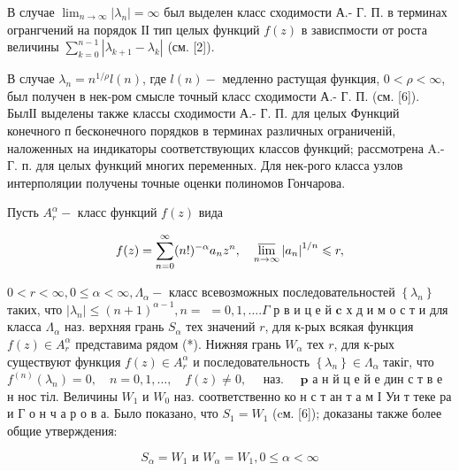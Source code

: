 \documentclass[10pt]{article}
\begin{document}
В случае $\lim _{n \rightarrow \infty}\left|\lambda_{n}\right|=\infty$ был выделен класс сходимости А.- Г. П. в терминах огрангчений на порядок ІІ тип целых функций $f(z)$ в зависпмости от роста величины $\sum_{k=0}^{n-1}\left|\lambda_{k+1}-\lambda_{k}\right|$ (см. [2]).



В случае $\lambda_{n}=n^{1 / \rho} l(n)$, где $l(n)-$ медленно растущая функция, $0<\rho<\infty$, был получен в нек-ром смысле точный класс сходимости А.- Г. П. (см. [6]). БылІІ выделены также классы сходимости А.- Г. П. для целых Функций конечного п бесконечного порядков в терминах различных ограниченій, наложенных на индикаторы соответствующих классов функций; рассмотрена A.- Г. п. для целых функций многих переменных. Для нек-рого класса узлов интерполяции получены точные оценки полиномов Гончарова.



Пусть $A_{r}^{\alpha}-$ класс функций $f(z)$ вида



\[

f(z)=\sum_{n=0}^{\infty}(n !)^{-\alpha} a_{n} z^{n}, \quad \varlimsup_{n \rightarrow \infty}\left|a_{n}\right|^{1 / n} \leqslant r,

\]



$0<r<\infty, 0 \leqslant \alpha<\infty, \Lambda_{\alpha}-$ класс всевозможных последовательностей $\left\{\lambda_{n}\right\}$ таких, что $\left|\lambda_{n}\right| \leqslant(n+1)^{\alpha-1}, n=$ $=0,1, \ldots . \Gamma$ р в и ц е й $\mathbf{c}$ х д и м о с т и для класса $\Lambda_{\alpha}$ наз. верхняя грань $S_{\alpha}$ тех значений $r$, для к-рых всякая функция $f(z) \in A_{r}^{\alpha}$ представима рядом (*). Нижняя грань $W_{\alpha}$ тех $r$, для к-рых существуют функция $f(z) \in A_{r}^{\alpha}$ и последовательность $\left\{\lambda_{n}\right\} \in \Lambda_{\alpha}$ такіг, что $f^{(n)}\left(\lambda_{n}\right)=0, \quad n=0,1, \ldots, \quad f(z) \neq 0, \quad$ наз. $\quad \mathbf{p}$ а н й ц е й е дин с т в е н нос тіл. Величины $W_{1}$ и $W_{0}$ наз. соответственно ко н с т ан т а м І Уи т теке ра и Г о н ч а р о в а. Было показано, что $S_{1}=W_{1}$ (cм. [6]); доказаны также более общие утверждения:



\[

S_{\alpha}=W_{1} \text { и } W_{\alpha}=W_{1}, 0 \leqslant \alpha<\infty

\]
\end{document}
